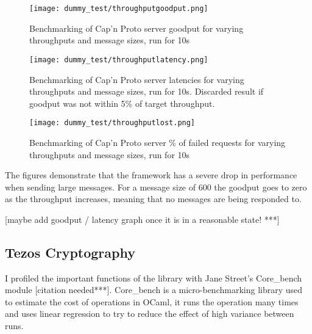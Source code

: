 \begin{figure}[h!]
\centering
\texttt{[image: dummy\_test/throughputgoodput.png]}
\caption{Benchmarking of Cap'n Proto server goodput for varying throughputs and message sizes, run for 10s}
\end{figure}

\begin{figure}[h!]
\centering
\texttt{[image: dummy\_test/throughputlatency.png]}
\caption{Benchmarking of Cap'n Proto server latencies for varying throughputs and message sizes, run for 10s. Discarded result if goodput was not within 5\% of target throughput.}
\end{figure}

\begin{figure}[h!]
\centering
\texttt{[image: dummy\_test/throughputlost.png]}
\caption{Benchmarking of Cap'n Proto server \% of failed requests for varying throughputs and message sizes, run for 10s}
\end{figure}

The figures demonstrate that the framework has a severe drop in performance when sending large messages. For a message size of 600 the goodput goes to zero as the throughput increases, meaning that no messages are being responded to.

[maybe add goodput / latency graph once it is in a reasonable state! ***]

\subsection{Tezos Cryptography} \label{tezosbenchmark}
I profiled the important functions of the library with Jane Street's Core\_bench module [citation needed***]. Core\_bench is a micro-benchmarking library used to estimate the cost of operations in OCaml, it runs the operation many times and uses linear regression to try to reduce the effect of high variance between runs.

